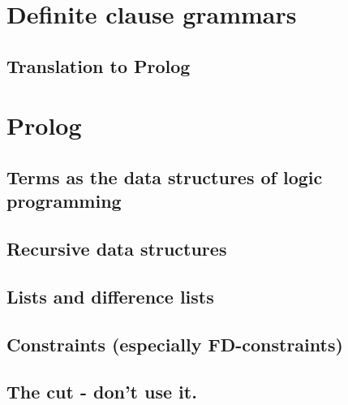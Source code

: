 \documentclass{article}
\begin{document}
\section{Definite clause grammars}
\subsection{Translation to Prolog}

\section{Prolog}
\subsection{Terms as the data structures of logic programming}
\subsection{Recursive data structures}
\subsection{Lists and difference lists}
\subsection{Constraints (especially FD-constraints)}
\subsection{The cut - don't use it.}
\end{document}
